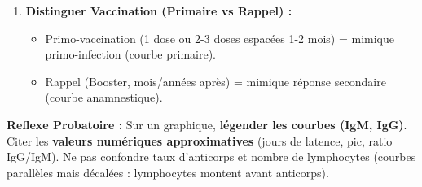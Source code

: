 \documentclass[11pt]{article}
\begin{document}
\begin{methode}
\begin{enumerate}
\begin{itemize}
            \item \textbf{Pente montée très raide} (logarithmique).
            \item \textbf{Pic 10-100x plus haut}.
            \item \textbf{IgG dominantes dès le début} (pas de pic IgM significatif ou très transitoire).
            \item \textbf{Affinité plus forte} (maturation affinité).
        \end{itemize}
        \item \textbf{Distinguer Vaccination (Primaire vs Rappel) :} 
        \begin{itemize}
            \item Primo-vaccination (1 dose ou 2-3 doses espacées 1-2 mois) = mimique primo-infection (courbe primaire).
            \item Rappel (Booster, mois/années après) = mimique réponse secondaire (courbe anamnestique).
        \end{itemize}
    \end{enumerate}
    \textbf{Reflexe Probatoire :} Sur un graphique, \textbf{légender les courbes (IgM, IgG)}. Citer les \textbf{valeurs numériques approximatives} (jours de latence, pic, ratio IgG/IgM). Ne pas confondre \og taux d'anticorps \fg et \og nombre de lymphocytes \fg (courbes parallèles mais décalées : lymphocytes montent avant anticorps).
\end{methode}
\end{document}
